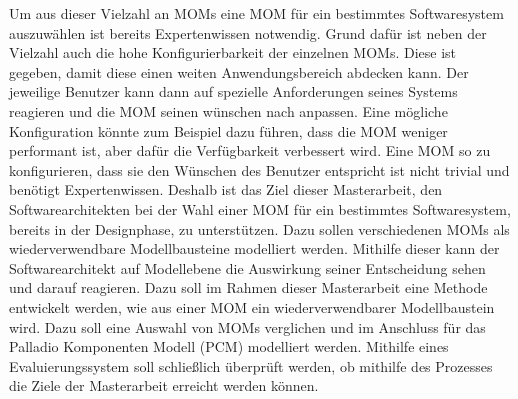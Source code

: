Um aus dieser Vielzahl an MOMs eine MOM für ein bestimmtes Softwaresystem auszuwählen ist bereits Expertenwissen notwendig. Grund dafür ist neben der Vielzahl auch die hohe Konfigurierbarkeit der einzelnen MOMs. Diese ist gegeben, damit diese einen weiten Anwendungsbereich abdecken kann. Der jeweilige Benutzer kann dann auf spezielle Anforderungen seines Systems reagieren und die MOM seinen wünschen nach anpassen. Eine mögliche Konfiguration könnte zum Beispiel dazu führen, dass die MOM weniger performant ist, aber dafür die Verfügbarkeit verbessert wird. Eine MOM so zu konfigurieren, dass sie den Wünschen des Benutzer entspricht ist nicht trivial und benötigt Expertenwissen. Deshalb ist das Ziel dieser Masterarbeit, den Softwarearchitekten bei der Wahl einer MOM für ein bestimmtes  Softwaresystem, bereits in der Designphase, zu unterstützen. Dazu sollen verschiedenen MOMs als wiederverwendbare Modellbausteine modelliert werden. Mithilfe dieser kann der Softwarearchitekt auf Modellebene die Auswirkung seiner Entscheidung sehen und darauf reagieren. Dazu soll im Rahmen dieser Masterarbeit eine Methode entwickelt werden, wie aus einer MOM ein wiederverwendbarer Modellbaustein wird. Dazu soll eine Auswahl von MOMs verglichen und im Anschluss für das Palladio Komponenten Modell (PCM) modelliert werden. Mithilfe eines Evaluierungssystem soll schließlich überprüft werden, ob mithilfe des Prozesses die Ziele der Masterarbeit erreicht werden können.


